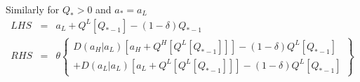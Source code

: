 Similarly for $Q_* > 0$ and $a_* = a_L$ 
\begin{eqnarray*}
LHS &=& a_L + Q^L [Q_{*-1}] - (1-\delta) Q_{*-1}\\
RHS &=& \theta \left\{ \begin{array}{ll}
D(a_H\vert a_L) [a_H + Q^H [Q^L [Q_{*-1}]]] - (1-\delta ) Q^L [Q_{*-1}]\\
+D(a_L\vert a_L) [a_L + Q^L [Q^L [Q_{*-1}]]] - (1-\delta ) Q^L [Q_{*-1}] \end{array} \right\}
\end{eqnarray*}
